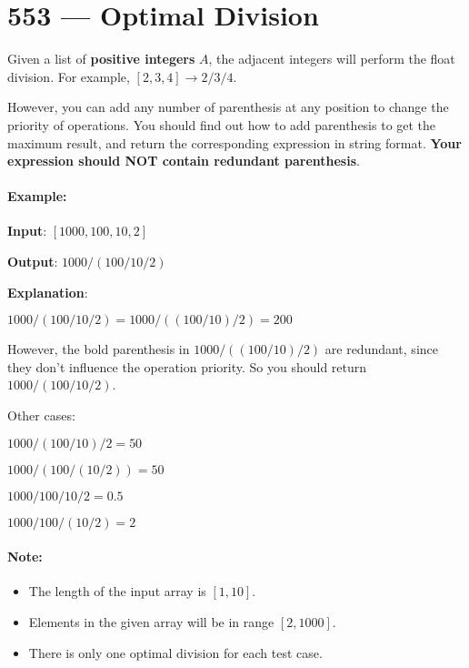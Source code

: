 \section{553 --- Optimal Division}
Given a list of \textbf{positive integers} $A$, the adjacent integers will perform the float division. For example, $[2,3,4] \longrightarrow 2 / 3 / 4$.

However, you can add any number of parenthesis at any position to change the priority of operations. You should find out how to add parenthesis to get the maximum result, and return the corresponding expression in string format. \textbf{Your expression should NOT contain redundant parenthesis}.

\paragraph{Example:}
\begin{flushleft}
\textbf{Input}: $[1000,100,10,2]$

\textbf{Output}: $1000/(100/10/2)$

\textbf{Explanation}:

$1000/(100/10/2) = 1000/((100/10)/2) = 200$

However, the bold parenthesis in $1000/((100/10)/2)$ are redundant, since they don't influence the operation priority. So you should return $1000/(100/10/2)$. 

Other cases:

$1000/(100/10)/2 = 50$

$1000/(100/(10/2)) = 50$

$1000/100/10/2 = 0.5$

$1000/100/(10/2) = 2$
\end{flushleft}

\paragraph{Note:}

\begin{itemize}
\item The length of the input array is $[1, 10]$.
\item Elements in the given array will be in range $[2, 1000]$.
\item There is only one optimal division for each test case.
\end{itemize}
